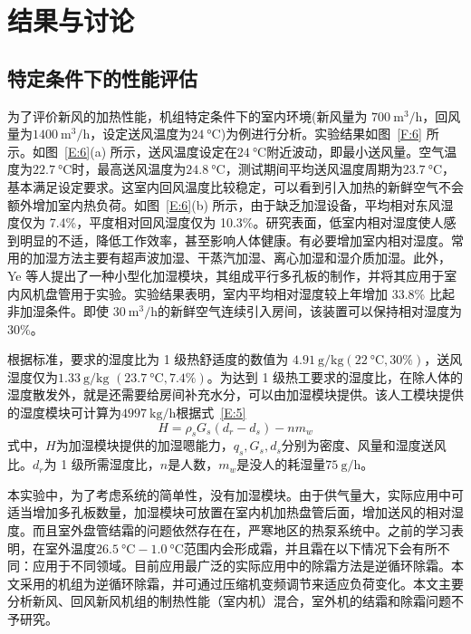 \section{结果与讨论}
\subsection{特定条件下的性能评估}
为了评价新风的加热性能，机组特定条件下的室内环境(新风量为 $\qty{700}{\m^3/\hour} $，回风量为$\qty{1400}{\m^3/\hour} $，设定送风温度为$\qty{24}{\degreeCelsius} $)为例进行分析。实验结果如图~\ref{F:6} 所示。如图~\ref{E:6}(a) 所示，送风温度设定在$\qty{24}{\degreeCelsius} $附近波动，即最小送风量。空气温度为$\qty{22.7}{\degreeCelsius} $时，最高送风温度为$\qty{24.8}{\degreeCelsius} $，测试期间平均送风温度周期为$\qty{23.7}{\degreeCelsius} $，基本满足设定要求。这室内回风温度比较稳定，可以看到引入加热的新鲜空气不会额外增加室内热负荷。如图~\ref{E:6}(b) 所示，由于缺乏加湿设备，平均相对东风湿度仅为 7.4\%，平度相对回风湿度仅为 10.3\%。研究表面，低室内相对湿度使人感到明显的不适，降低工作效率，甚至影响人体健康。有必要增加室内相对湿度。常用的加湿方法主要有超声波加湿、干蒸汽加湿、离心加湿和湿介质加湿。此外，Ye 等人提出了一种小型化加湿模块，其组成平行多孔板的制作，并将其应用于室内风机盘管用于实验。实验结果表明，室内平均相对湿度较上年增加 33.8\% 比起非加湿条件。即使 $\qty{30}{\m^3/\hour} $的新鲜空气连续引入房间，该装置可以保持相对湿度为 30\%。

根据标准，要求的湿度比为 1 级热舒适度的数值为 $\qty{4.91}{\g/\kg}(\qty{22}{\degreeCelsius}, 30\%)$，送风湿度仅为$\qty{1.33}{\g/\kg}$
$(\qty{23.7}{\degreeCelsius}, 7.4\%)$。为达到 1 级热工要求的湿度比，在除人体的湿度散发外，就是还需要给房间补充水分，可以由加湿模块提供。该人工模块提供的湿度模块可计算为$\qty{4997}{\kg/\hour} $根据式~\ref{E:5}
\begin{equation}\label{E:5}
	H = \rho_s G_s (d_r - d_s) - nm_w
\end{equation}
式中，$H$为加湿模块提供的加湿嗯能力，$q_s, G_s, d_s$分别为密度、风量和湿度送风比。$d_r$为 1 级所需湿度比，$n$是人数，$m_w$是没人的耗湿量$\qty{75}{\g/\hour} $。

本实验中，为了考虑系统的简单性，没有加湿模块。由于供气量大，实际应用中可适当增加多孔板数量，加湿模块可放置在室内机加热盘管后面，增加送风的相对湿度。而且室外盘管结霜的问题依然存在在，严寒地区的热泵系统中。之前的学习表明，在室外温度$\qty{26.5}{\degreeCelsius} - \qty{1.0}{\degreeCelsius}{} $范围内会形成霜，并且霜在以下情况下会有所不同：应用于不同领域。目前应用最广泛的实际应用中的除霜方法是逆循环除霜。本文采用的机组为逆循环除霜，并可通过压缩机变频调节来适应负荷变化。本文主要分析新风、回风新风机组的制热性能（室内机）混合，室外机的结霜和除霜问题不予研究。

